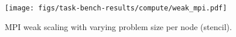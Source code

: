 \begin{figure}[t]
\centering
\texttt{[image: figs/task-bench-results/compute/weak\_mpi.pdf]}
\vspace{-0.7cm}
\caption{MPI weak scaling with varying problem size per node (stencil).\label{fig:weak-scaling-mpi}}
\vspace{-0.1cm}
\end{figure}
